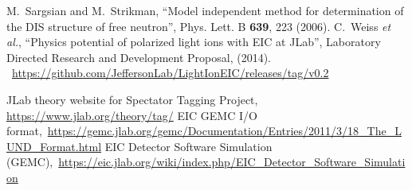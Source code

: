 \documentclass[12pt,letterpaper]{article}
\begin{document}
\begin{thebibliography}{0}
 \small{M.~Sargsian and M.~Strikman, ``Model independent method for determination of the DIS structure of free neutron'', Phys. Lett. B \textbf{639}, 223 (2006).}
 \small{C.~Weiss {\em et al.}, ``Physics potential of polarized light ions with EIC at JLab'', Laboratory Directed Research and Development Proposal, (2014).}
 \small{~\url{https://github.com/JeffersonLab/LightIonEIC/releases/tag/v0.2}}

 \small{JLab theory website for Spectator Tagging Project, \url{https://www.jlab.org/theory/tag/}}
 \small{EIC GEMC I/O format,~\url{https://gemc.jlab.org/gemc/Documentation/Entries/2011/3/18_The_LUND_Format.html}}
 \small{EIC Detector Software Simulation (GEMC),~\url{https://eic.jlab.org/wiki/index.php/EIC_Detector_Software_Simulation}}

\end{thebibliography}
\end{document}
